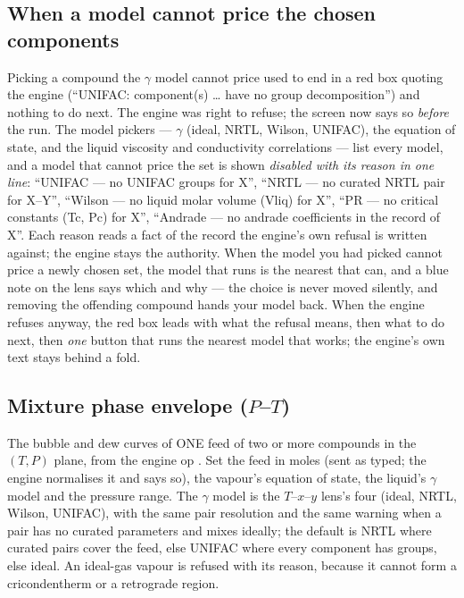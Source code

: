 \documentclass[11pt,a4paper]{article}
\begin{document}
\subsection{When a model cannot price the chosen components}\label{sec:explorer-model-applicability}
Picking a compound the \(\gamma\) model cannot price used to end in a red box
quoting the engine (``UNIFAC: component(s) \dots{} have no group
decomposition'') and nothing to do next.  The engine was right to refuse; the
screen now says so \emph{before} the run.  The model pickers --- \(\gamma\)
(ideal, NRTL, Wilson, UNIFAC), the equation of state, and the liquid
viscosity and conductivity correlations --- list every model, and a model that
cannot price the set is shown \emph{disabled with its reason in one line}:
``UNIFAC --- no UNIFAC groups for X'', ``NRTL --- no curated NRTL pair for
X--Y'', ``Wilson --- no liquid molar volume (Vliq) for X'', ``PR --- no critical
constants (Tc, Pc) for X'', ``Andrade --- no andrade coefficients in the record
of X''.  Each reason reads a fact of the record the engine's own refusal is
written against; the engine stays the authority.  When the model you had picked
cannot price a newly chosen set, the model that runs is the nearest that can,
and a blue note on the lens says which and why --- the choice is never moved
silently, and removing the offending compound hands your model back.  When the
engine refuses anyway, the red box leads with what the refusal means, then
what to do next, then \emph{one} button that runs the nearest model that works;
the engine's own text stays behind a fold.

\subsection{Mixture phase envelope ($P$--$T$)}\label{sec:explorer-envelope}
The bubble and dew curves of ONE feed of two or more compounds in the
$(T, P)$ plane, from the engine op .  Set the feed in
moles (sent as typed; the engine normalises it and says so), the vapour's
equation of state, the liquid's $\gamma$ model and the pressure range.  The
$\gamma$ model is the $T$--$x$--$y$ lens's four (ideal, NRTL, Wilson, UNIFAC),
with the same pair resolution and the same warning when a pair has no curated
parameters and mixes ideally; the default is NRTL where curated pairs cover
the feed, else UNIFAC where every component has groups, else ideal.  An
ideal-gas vapour is refused with its reason, because it cannot form a
cricondentherm or a retrograde region.
\end{document}
